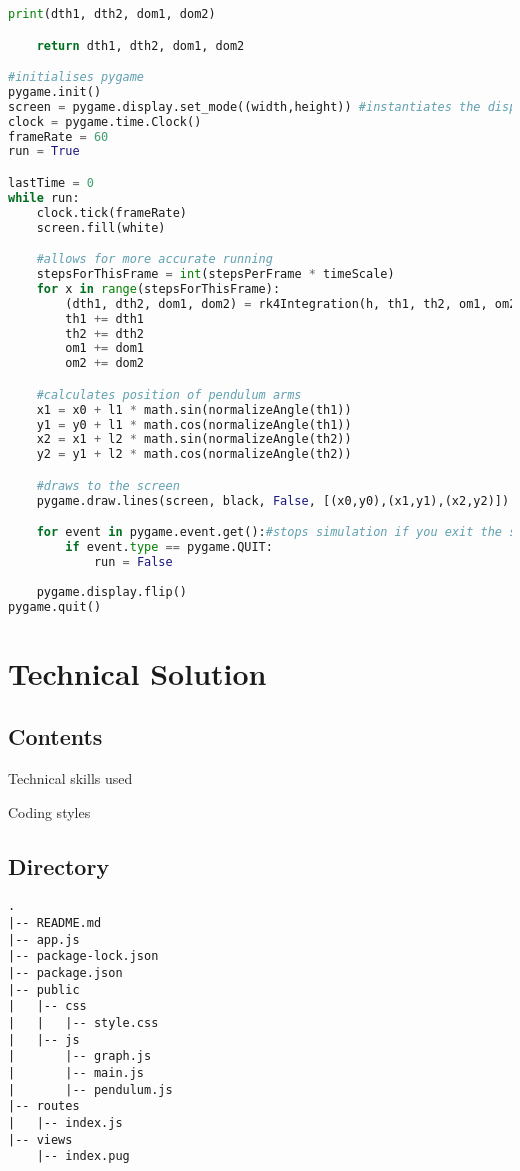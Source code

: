 \documentclass[12pt]{article}
\begin{document}
\begin{lstlisting}[language=Python]
    print(dth1, dth2, dom1, dom2)

    return dth1, dth2, dom1, dom2

#initialises pygame
pygame.init()
screen = pygame.display.set_mode((width,height)) #instantiates the display
clock = pygame.time.Clock()
frameRate = 60
run = True

lastTime = 0
while run:
    clock.tick(frameRate)
    screen.fill(white)

    #allows for more accurate running
    stepsForThisFrame = int(stepsPerFrame * timeScale)
    for x in range(stepsForThisFrame):
        (dth1, dth2, dom1, dom2) = rk4Integration(h, th1, th2, om1, om2)
        th1 += dth1
        th2 += dth2
        om1 += dom1
        om2 += dom2

    #calculates position of pendulum arms
    x1 = x0 + l1 * math.sin(normalizeAngle(th1))
    y1 = y0 + l1 * math.cos(normalizeAngle(th1))
    x2 = x1 + l2 * math.sin(normalizeAngle(th2))
    y2 = y1 + l2 * math.cos(normalizeAngle(th2))

    #draws to the screen
    pygame.draw.lines(screen, black, False, [(x0,y0),(x1,y1),(x2,y2)])

    for event in pygame.event.get():#stops simulation if you exit the screen
        if event.type == pygame.QUIT:
            run = False
    
    pygame.display.flip()
pygame.quit()

\end{lstlisting}


\newpage
\section{Technical Solution}

\subsection{Contents}

Technical skills used

Coding styles

\subsection{Directory}
\begin{lstlisting}
.
|-- README.md
|-- app.js
|-- package-lock.json
|-- package.json
|-- public
|   |-- css
|   |   |-- style.css
|   |-- js
|       |-- graph.js
|       |-- main.js
|       |-- pendulum.js
|-- routes
|   |-- index.js
|-- views
    |-- index.pug
\end{lstlisting}
\end{document}
